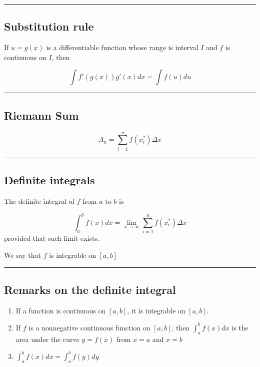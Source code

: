 \documentclass[
  landscape,  
  10pt,
]{article}
\begin{document}
\begin{multicols}{3}
\begin{center}\rule{0.5\linewidth}{0.5pt}\end{center}

\hypertarget{substitution-rule}{%
\subsection{Substitution rule}\label{substitution-rule}}

If \(u=g(x)\) is a differentiable function whose range is interval \(I\)
and \(f\) is continuous on \(I\), then

\[ \int f'(g(x))g'(x)dx = \int f(u)du \]

\begin{center}\rule{0.5\linewidth}{0.5pt}\end{center}

\hypertarget{riemann-sum}{%
\subsection{Riemann Sum}\label{riemann-sum}}

\[A_n = \sum_{i=1}^{n}f(x_i^*)\Delta x \]

\begin{center}\rule{0.5\linewidth}{0.5pt}\end{center}

\hypertarget{definite-integrals}{%
\subsection{Definite integrals}\label{definite-integrals}}

The definite integral of \(f\) from \(a\) to \(b\) is

\[ \int_a^b f(x)dx = \lim_{x\to\infty}\sum_{i=1}^{n} f(x_i^*)\Delta x \]
provided that such limit exists.

We say that \(f\) is integrable on \([a,b]\)

\begin{center}\rule{0.5\linewidth}{0.5pt}\end{center}

\hypertarget{remarks-on-the-definite-integral}{%
\subsection{Remarks on the definite
integral}\label{remarks-on-the-definite-integral}}

\begin{enumerate}
\def\labelenumi{\arabic{enumi}.}
\item
  If a function is continuous on \([a,b]\), it is integrable on
  \([a,b]\).
\item
  If \(f\) is a nonnegative continuous function on \([a,b]\), then
  \(\displaystyle\int_a^b f(x)dx\) is the area under the curve
  \(y=f(x)\) from \(x=a\) and \(x=b\)
\item
  \(\displaystyle\int_a^b f(x)dx = \int_a^b f(y)dy\)
\end{enumerate}


\end{multicols}
\end{document}
